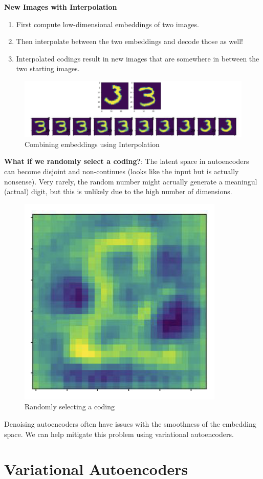 \textbf{New Images with Interpolation}
\begin{enumerate}
    \item First compute low-dimensional embeddings of two images.
    \item Then interpolate between the two embeddings and decode those as well!
    \item Interpolated codings result in new images that are somewhere in between the two starting images.
\end{enumerate}

\begin{figure}[h!t]
    \centering
    \includegraphics[width=0.75\linewidth]{interpolationex.png}
    \caption{Combining embeddings using Interpolation}
    \label{fig:enter-label}
\end{figure}

\textbf{What if we randomly select a coding?}: The latent space in autoencoders can become disjoint and non-continues (looks like the input but is actually nonsense). Very rarely, the random number might acrually generate a meaningul (actual) digit, but this is unlikely due to the high number of dimensions.

\begin{figure}[h!t]
    \centering
    \includegraphics[width=0.15\linewidth]{randomcoding.png}
    \caption{Randomly selecting a coding}
    \label{fig:enter-label}
\end{figure}

\begin{idea}
   Denoising autoencoders often have issues with the smoothness of the embedding space. We can help mitigate this problem using variational autoencoders.
\end{idea}

\section{Variational Autoencoders}

